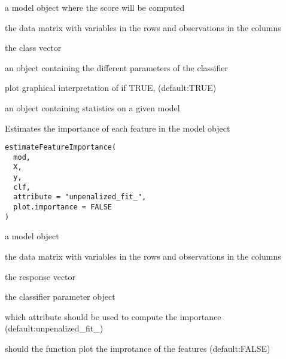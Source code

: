 \documentclass[a4paper]{book}
\begin{document}
\begin{Arguments}
\begin{ldescription}
\item[\code{mod:}] a model object where the score will be computed

\item[\code{X:}] the data matrix with variables in the rows and observations in the columns

\item[\code{y:}] the class vector

\item[\code{clf:}] an object containing the different parameters of the classifier

\item[\code{plot:}] plot graphical interpretation of if TRUE, (default:TRUE)
\end{ldescription}
\end{Arguments}
%
\begin{Value}
an object containing statistics on a given model
\end{Value}
%
\begin{Description}
Estimates the importance of each feature in the model object
\end{Description}
%
\begin{Usage}
\begin{verbatim}
estimateFeatureImportance(
  mod,
  X,
  y,
  clf,
  attribute = "unpenalized_fit_",
  plot.importance = FALSE
)
\end{verbatim}
\end{Usage}
%
\begin{Arguments}
\begin{ldescription}
\item[\code{mod:}] a model object

\item[\code{X:}] the data matrix with variables in the rows and observations in the columns

\item[\code{y:}] the response vector

\item[\code{clf:}] the classifier parameter object

\item[\code{attribute:}] which attribute should be used to compute the importance (default:unpenalized\_fit\_)

\item[\code{plot.importance:}] should the function plot the improtance of the features (default:FALSE)
\end{ldescription}
\end{Arguments}
\end{document}
